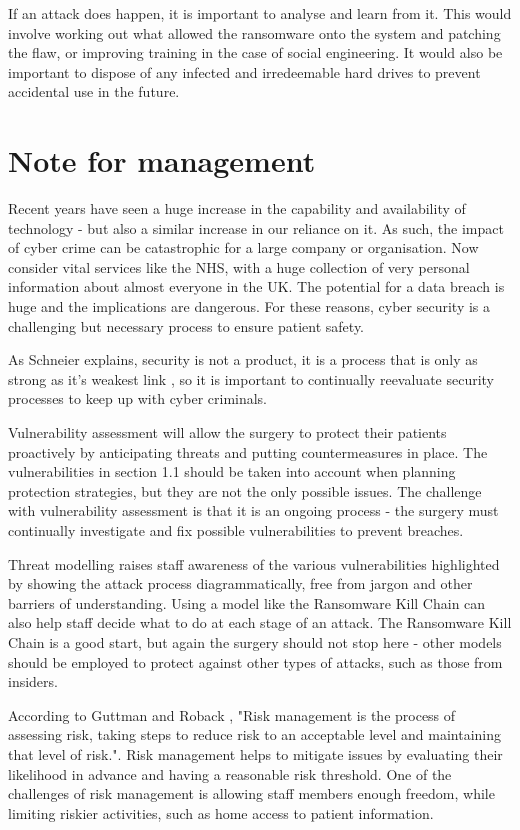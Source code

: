 \documentclass[12pt,a4paper]{article}
\begin{document}
If an attack does happen, it is important to analyse and learn from it. This would involve working out what allowed the ransomware onto the system and patching the flaw, or improving training in the case of social engineering. It would also be important to dispose of any infected and irredeemable hard drives to prevent accidental use in the future.

\section{Note for management}
Recent years have seen a huge increase in the capability and availability of technology - but also a similar increase in our reliance on it. As such, the impact of cyber crime can be catastrophic for a large company or organisation. Now consider vital services like the NHS, with a huge collection of very personal information about almost everyone in the UK. The potential for a data breach is huge and the implications are dangerous. For these reasons, cyber security is a challenging but necessary process to ensure patient safety. 

As Schneier explains, security is not a product, it is a process that is only as strong as it's weakest link \cite{processproduct}, so it is important to continually reevaluate security processes to keep up with cyber criminals.

Vulnerability assessment will allow the surgery to protect their patients proactively by anticipating threats and putting countermeasures in place. The vulnerabilities in section 1.1 should be taken into account when planning protection strategies, but they are not the only possible issues. The challenge with vulnerability assessment is that it is an ongoing process - the surgery must continually investigate and fix possible vulnerabilities to prevent breaches.

Threat modelling raises staff awareness of the various vulnerabilities highlighted by showing the attack process diagrammatically, free from jargon and other barriers of understanding.  Using a model like the Ransomware Kill Chain can also help staff decide what to do at each stage of an attack. The Ransomware Kill Chain is a good start, but again the surgery should not stop here - other models should be employed to protect against other types of attacks, such as those from insiders.

According to Guttman and Roback \cite{RiskManagement}, "Risk management is the process of assessing risk, taking steps to reduce risk to an acceptable level and maintaining that level of risk.". Risk management helps to mitigate issues by evaluating their likelihood in advance and having a reasonable risk threshold. One of the challenges of risk management is allowing staff members enough freedom, while limiting riskier activities, such as home access to patient information.
\end{document}
